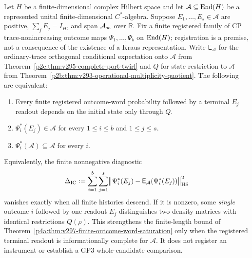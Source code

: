 \documentclass[12pt,a4paper]{article}
\begin{document}
\begin{theorem}
\label{p4a:thm:v298-ic-one-step-outcome-descent}
Let $H$ be a finite-dimensional complex Hilbert space and let
$\mathcal A\subseteq\operatorname{End}(H)$ be a represented unital finite-dimensional
$C^*$-algebra. Suppose $E_1,\ldots,E_s\in\mathcal A$ are positive,
$\sum_jE_j=I_H$, and span $\mathcal A_{\rm sa}$ over $\mathbb R$.
Fix a finite registered family of CP trace-nonincreasing outcome maps
$\Psi_1,\ldots,\Psi_b$ on $\operatorname{End}(H)$; registration is a premise, not a
consequence of the existence of a Kraus representation.
Write $\mathsf E_{\mathcal A}$ for the ordinary-trace orthogonal conditional
expectation onto $\mathcal A$ from
Theorem~\ref{p2c:thm:v295-complete-port-twirl} and $Q$ for state restriction
to $\mathcal A$ from
Theorem~\ref{p2b:thm:v293-operational-multiplicity-quotient}.
The following are equivalent:
\begin{enumerate}[label=(\roman*),leftmargin=2em]
\item Every finite registered outcome-word probability followed by a
terminal $E_j$ readout depends on the initial state only through $Q$.
\item $\Psi_i^*(E_j)\in\mathcal A$ for every $1\le i\le b$ and
$1\le j\le s$.
\item $\Psi_i^*(\mathcal A)\subseteq\mathcal A$ for every $i$.
\end{enumerate}
Equivalently, the finite nonnegative diagnostic
\[
\Delta_{\rm IC}:=\sum_{i=1}^b\sum_{j=1}^s
\bigl\|\Psi_i^*(E_j)-\mathsf E_{\mathcal A}(\Psi_i^*(E_j))\bigr\|_{\rm HS}^2
\]
vanishes exactly when all finite histories descend. If it is nonzero,
some \emph{single} outcome $i$ followed by one readout $E_j$ distinguishes
two density matrices with identical restrictions $Q(\rho)$.
This strengthens the finite-length bound of
Theorem~\ref{p4a:thm:v297-finite-outcome-word-saturation} only when the
registered terminal readout is informationally complete for $\mathcal A$.
It does not register an instrument or establish a GP3 whole-candidate
comparison.
\end{theorem}
\end{document}
